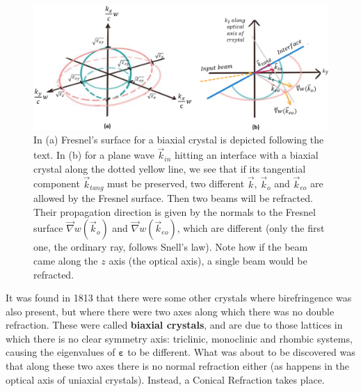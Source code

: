 \documentclass[11pt, a4paper, twoside]{article} %
\begin{document}
\begin{figure}[h!] 
     \centering 

    \includegraphics[width=0.82\linewidth]{uni.PNG}
    \caption{In (a) Fresnel's surface for a biaxial crystal is depicted following the text. In (b) for a plane wave $\vec{k}_{in}$ hitting an interface with a biaxial crystal along the dotted yellow line, we see that if its tangential component $\vec{k}_{tang}$ must be preserved, two different $\vec{k}$, $\vec{k}_o$ and $\vec{k}_{eo}$ are allowed by the Fresnel surface. Then two beams will be refracted. Their propagation direction is given by the normals to the Fresnel surface $\vec{\nabla}w(\vec{k}_o)$ and $\vec{\nabla}w(\vec{k}_{eo})$, which are different (only the first one, the ordinary ray, follows Snell's law). Note how if the beam came along the $z$ axis (the optical axis), a single beam would be refracted.}
        \label{fig:concentric1}
\vspace{-0.2cm}
\end{figure}

It was found in 1813 that there were some other crystals where birefringence was also present, but where there were two axes along which there was no double refraction. These were called {\bf biaxial crystals}, and are due to those lattices in which there is no clear symmetry axis: triclinic, monoclinic and rhombic systems, causing the eigenvalues of $\pmb{\varepsilon}$ to be different. What was about to be discovered was that along these two axes there is no normal refraction either (as happens in the optical axis of uniaxial crystals). Instead, a Conical Refraction takes place.
\end{document}
